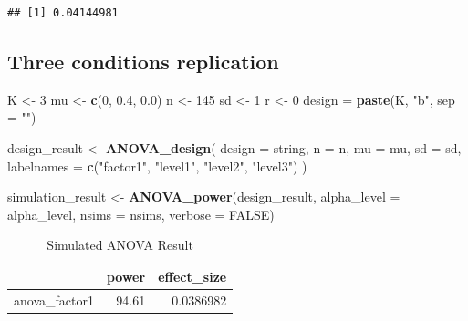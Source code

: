 \documentclass[]{book}
\newenvironment{Shaded}{\begin{snugshade}}{\end{snugshade}}
\newcommand{\DataTypeTok}[1]{\textcolor[rgb]{0.13,0.29,0.53}{#1}}
\newcommand{\DecValTok}[1]{\textcolor[rgb]{0.00,0.00,0.81}{#1}}
\newcommand{\FloatTok}[1]{\textcolor[rgb]{0.00,0.00,0.81}{#1}}
\newcommand{\KeywordTok}[1]{\textcolor[rgb]{0.13,0.29,0.53}{\textbf{#1}}}
\newcommand{\NormalTok}[1]{#1}
\newcommand{\OtherTok}[1]{\textcolor[rgb]{0.56,0.35,0.01}{#1}}
\newcommand{\StringTok}[1]{\textcolor[rgb]{0.31,0.60,0.02}{#1}}
\begin{document}
\begin{verbatim}
## [1] 0.04144981
\end{verbatim}

\hypertarget{three-conditions-replication-1}{%
\subsection{Three conditions replication}\label{three-conditions-replication-1}}

\begin{Shaded}
\begin{Highlighting}[]
\NormalTok{K <-}\StringTok{ }\DecValTok{3}
\NormalTok{mu <-}\StringTok{ }\KeywordTok{c}\NormalTok{(}\DecValTok{0}\NormalTok{, }\FloatTok{0.4}\NormalTok{, }\FloatTok{0.0}\NormalTok{)}
\NormalTok{n <-}\StringTok{ }\DecValTok{145}
\NormalTok{sd <-}\StringTok{ }\DecValTok{1}
\NormalTok{r <-}\StringTok{ }\DecValTok{0}
\NormalTok{design =}\StringTok{ }\KeywordTok{paste}\NormalTok{(K, }\StringTok{"b"}\NormalTok{, }\DataTypeTok{sep =} \StringTok{""}\NormalTok{)}
\end{Highlighting}
\end{Shaded}

\begin{Shaded}
\begin{Highlighting}[]
\NormalTok{design_result <-}\StringTok{ }\KeywordTok{ANOVA_design}\NormalTok{(}
  \DataTypeTok{design =}\NormalTok{ string,}
  \DataTypeTok{n =}\NormalTok{ n,}
  \DataTypeTok{mu =}\NormalTok{ mu,}
  \DataTypeTok{sd =}\NormalTok{ sd,}
  \DataTypeTok{labelnames =} \KeywordTok{c}\NormalTok{(}\StringTok{"factor1"}\NormalTok{, }\StringTok{"level1"}\NormalTok{, }\StringTok{"level2"}\NormalTok{, }\StringTok{"level3"}\NormalTok{)}
\NormalTok{  )}
\end{Highlighting}
\end{Shaded}

\begin{Shaded}
\begin{Highlighting}[]
\NormalTok{simulation_result <-}\StringTok{ }\KeywordTok{ANOVA_power}\NormalTok{(design_result, }
                                 \DataTypeTok{alpha_level =}\NormalTok{ alpha_level, }
                                 \DataTypeTok{nsims =}\NormalTok{ nsims,}
                                 \DataTypeTok{verbose =} \OtherTok{FALSE}\NormalTok{)}
\end{Highlighting}
\end{Shaded}

\begin{table}[t]

\caption{\label{tab:unnamed-chunk-63}Simulated ANOVA Result}
\centering
\begin{tabular}{l|r|r}
\hline
  & power & effect\_size\\
\hline
anova\_factor1 & 94.61 & 0.0386982\\
\hline
\end{tabular}
\end{table}
\end{document}
